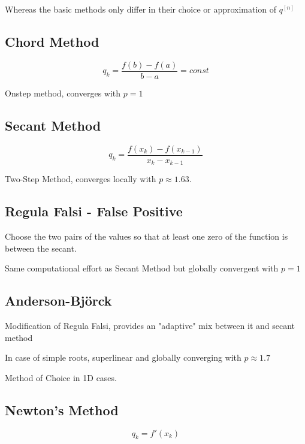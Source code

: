 \documentclass[
    a4paper,
    11pt
]{article}
\begin{document}
Whereas the basic methods only differ in their choice or approximation of
$q^{[n]}$

\subsection{Chord Method}

\begin{equation}
    q_k = \frac{f(b) - f(a)}{b - a} = const
\end{equation}

Onstep method, converges with $p=1$

\subsection{Secant Method}

\begin{equation}
    q_k = \frac{f(x_k) - f(x_{k-1})}{x_k - x_{k-1}}
\end{equation}

Two-Step Method, converges locally with $p \approx 1.63$.

\subsection{Regula Falsi - False Positive}

Choose the two pairs of the values so that at least one zero of the function is
between the secant.

Same computational effort as Secant Method but globally convergent with $p=1$

\subsection{Anderson-Björck}

Modification of Regula Falsi, provides an "adaptive" mix between it and secant
method

In case of simple roots, superlinear and globally converging with $p \approx
1.7$

Method of Choice in 1D cases.

\subsection{Newton's Method}

\begin{equation}
    q_k = f'(x_k)
\end{equation}
\end{document}
